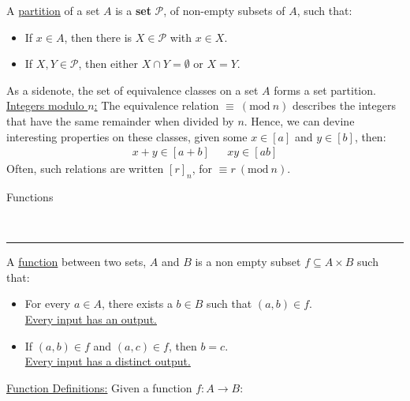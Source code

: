 \documentclass{article}
\newcommand{\header}[1]{\begin{large}\noindent #1\end{large}\\\rule{\textwidth}{0.5pt}}
\newcommand{\gap}{\medskip\\}
\newcommand{\sheader}[1]{\underline{#1:}}
\newcommand{\sgap}{\smallskip\\}
\newcommand{\Mod}[1]{\ (\mathrm{mod}\ #1)}
\begin{document}
A \underline{partition} of a set $A$ is a \textbf{set} $\mathcal{P}$, of non-empty 
subsets of $A$, such that:
\begin{itemize}
    \item If $x \in A$, then there is $X \in \mathcal{P}$ with $x \in X$.
    \item If $X, Y \in \mathcal{P}$, then either $X \cap Y = \emptyset$ or $X = Y$.
\end{itemize}
As a sidenote, the set of equivalence classes on a set $A$ forms a set partition.
\pagebreak
\gap
\sheader{Integers modulo $n$} The equivalence relation $\equiv \Mod{n}$
describes the integers that have the same remainder when divided by $n$.
Hence, we can devine interesting properties on these classes, given some 
$x \in [a]$ and $y \in [b]$, then:
\begin{align*}
    x + y \in [a + b] && xy \in [ab]
\end{align*}
Often, such relations are written $[r]_n$, for $\equiv r \Mod{n}$.
\gap
\header{Functions}
A \underline{function} between two sets, $A$ and $B$ is a non empty subset $f \subseteq A \times B$
such that:
\begin{itemize}
    \item For every $a \in A$, there exists a $b \in B$ such that $(a, b) \in f$.
    \sgap
    \underline{Every input has an output.}
    \item If $(a, b) \in f$ and $(a, c) \in f$, then $b = c$. 
    \sgap
    \underline{Every input has a distinct output.}
\end{itemize}
\sheader{Function Definitions} Given a function $f: A \to B$:
\end{document}
